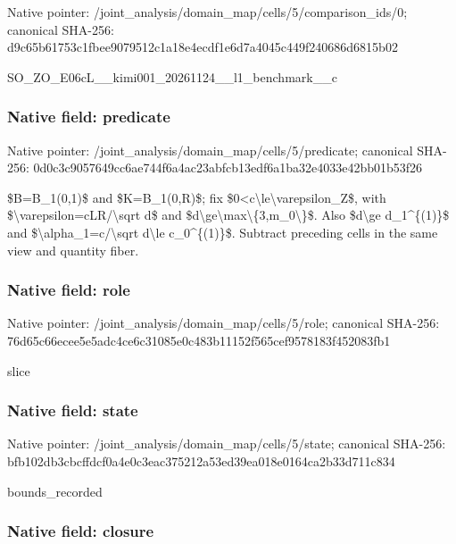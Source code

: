 \documentclass[10pt,a4paper]{article}
\begin{document}
Native pointer: /joint\_analysis/domain\_m\allowbreak{}ap/cells/5/comparison\_id\allowbreak{}s/0; canonical SHA-256: d9c65b61753c1fbee9079512\allowbreak{}c1a18e4ecdf1e6d7a4045c44\allowbreak{}9f240686d6815b02


SO\_ZO\_E06cL\_\_kimi001\_202\allowbreak{}61124\_\_l1\_benchmark\_\_c


\subsubsection{Native field: predicate}


Native pointer: /joint\_analysis/domain\_m\allowbreak{}ap/cells/5/predicate; canonical SHA-256: 0d0c3c9057649cc6ae744f6a\allowbreak{}4ac23abfcb13edf6a1ba32e4\allowbreak{}033e42bb01b53f26


\$B=B\_1(0,1)\$ and \$K=B\_1(0,R)\$; fix \$0<c\textbackslash{}le\textbackslash{}varepsilon\_Z\$, with \$\textbackslash{}varepsilon=cLR/\textbackslash{}sqrt d\$ and \$d\textbackslash{}ge\textbackslash{}max\textbackslash{}\{3,m\_0\textbackslash{}\}\$. Also \$d\textbackslash{}ge d\_1\textasciicircum{}\{(1)\}\$ and \$\textbackslash{}alpha\_1=c/\textbackslash{}sqrt d\textbackslash{}le c\_0\textasciicircum{}\{(1)\}\$. Subtract preceding cells in the same view and quantity fiber.


\subsubsection{Native field: role}


Native pointer: /joint\_analysis/domain\_map/cells/5/role; canonical SHA-256: 76d65c66ecee5e5adc4ce6c3\allowbreak{}1085e0c483b11152f565cef9\allowbreak{}578183f452083fb1


slice


\subsubsection{Native field: state}


Native pointer: /joint\_analysis/domain\_m\allowbreak{}ap/cells/5/state; canonical SHA-256: bfb102db3cbcffdcf0a4e0c3\allowbreak{}eac375212a53ed39ea018e01\allowbreak{}64ca2b33d711c834


bounds\_recorded


\subsubsection{Native field: closure}
\end{document}
